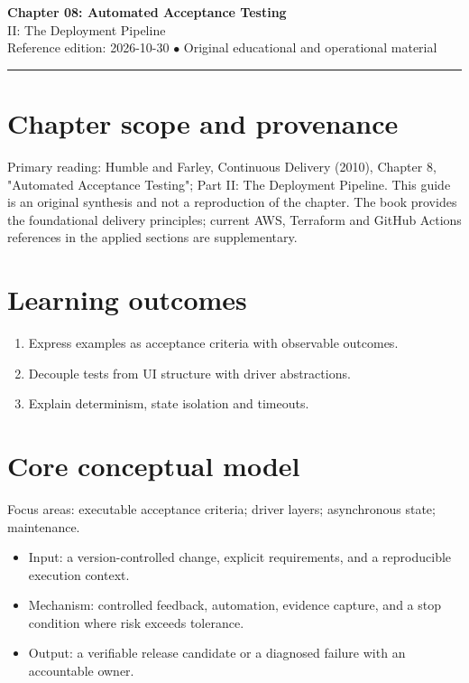 \documentclass[10pt,letterpaper]{article}
\begin{document}
\begin{center}
{\LARGE\bfseries\color{cdblue}Chapter 08: Automated Acceptance Testing}\\[7pt]
{\large II: The Deployment Pipeline}\\[6pt]
{\small Reference edition: 2026-10-30 $\bullet$ Original educational and operational material}
\end{center}
\noindent\color{cdblue}\rule{\linewidth}{1.2pt}\color{black}
\vspace{0.4em}
\section{Chapter scope and provenance}
Primary reading: Humble and Farley, Continuous Delivery (2010), Chapter 8, "Automated Acceptance Testing"; Part II: The Deployment Pipeline. This guide is an original synthesis and not a reproduction of the chapter. The book provides the foundational delivery principles; current AWS, Terraform and GitHub Actions references in the applied sections are supplementary.


\section{Learning outcomes}
\begin{enumerate}
\item Express examples as acceptance criteria with observable outcomes.
\item Decouple tests from UI structure with driver abstractions.
\item Explain determinism, state isolation and timeouts.
\end{enumerate}

\section{Core conceptual model}
Focus areas: executable acceptance criteria; driver layers; asynchronous state; maintenance.

\begin{itemize}
\item Input: a version-controlled change, explicit requirements, and a reproducible execution context.
\item Mechanism: controlled feedback, automation, evidence capture, and a stop condition where risk exceeds tolerance.
\item Output: a verifiable release candidate or a diagnosed failure with an accountable owner.
\end{itemize}
\end{document}
